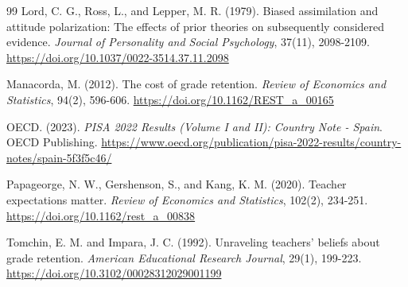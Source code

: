 \documentclass[12pt,a4paper]{article}
\begin{document}
\begin{thebibliography}{99}
Lord, C. G., Ross, L., and Lepper, M. R. (1979).
Biased assimilation and attitude polarization: The effects of prior theories on subsequently considered evidence.
\textit{Journal of Personality and Social Psychology}, 37(11), 2098-2109.
\url{https://doi.org/10.1037/0022-3514.37.11.2098}

Manacorda, M. (2012).
The cost of grade retention.
\textit{Review of Economics and Statistics}, 94(2), 596-606.
\url{https://doi.org/10.1162/REST_a_00165}

OECD. (2023).
\textit{PISA 2022 Results (Volume I and II): Country Note - Spain}.
OECD Publishing.
\url{https://www.oecd.org/publication/pisa-2022-results/country-notes/spain-5f3f5c46/}

Papageorge, N. W., Gershenson, S., and Kang, K. M. (2020).
Teacher expectations matter.
\textit{Review of Economics and Statistics}, 102(2), 234-251.
\url{https://doi.org/10.1162/rest_a_00838}

Tomchin, E. M. and Impara, J. C. (1992).
Unraveling teachers' beliefs about grade retention.
\textit{American Educational Research Journal}, 29(1), 199-223.
\url{https://doi.org/10.3102/00028312029001199}

\end{thebibliography}
\end{document}
